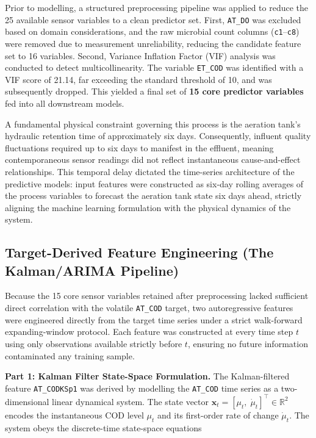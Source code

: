 \documentclass[conference]{IEEEtran}
\begin{document}
Prior to modelling, a structured preprocessing pipeline was applied to reduce the 25 available sensor variables to a clean predictor set. First, \texttt{AT\_DO} was excluded based on domain considerations, and the raw microbial count columns (\texttt{c1}--\texttt{c8}) were removed due to measurement unreliability, reducing the candidate feature set to 16 variables. Second, Variance Inflation Factor (VIF) analysis was conducted to detect multicollinearity. The variable \texttt{ET\_COD} was identified with a VIF score of 21.14, far exceeding the standard threshold of 10, and was subsequently dropped. This yielded a final set of \textbf{15 core predictor variables} fed into all downstream models.

A fundamental physical constraint governing this process is the aeration tank's hydraulic retention time of approximately six days. Consequently, influent quality fluctuations required up to six days to manifest in the effluent, meaning contemporaneous sensor readings did not reflect instantaneous cause-and-effect relationships. This temporal delay dictated the time-series architecture of the predictive models: input features were constructed as six-day rolling averages of the process variables to forecast the aeration tank state six days ahead, strictly aligning the machine learning formulation with the physical dynamics of the system.

\subsection{Target-Derived Feature Engineering (The Kalman/ARIMA Pipeline)}

Because the 15 core sensor variables retained after preprocessing lacked sufficient direct correlation with the volatile \texttt{AT\_COD} target, two autoregressive features were engineered directly from the target time series under a strict walk-forward expanding-window protocol. Each feature was constructed at every time step $t$ using only observations available strictly before $t$, ensuring no future information contaminated any training sample.

\textbf{Part 1: Kalman Filter State-Space Formulation.}
The Kalman-filtered feature \texttt{AT\_CODKSp1} was derived by modelling the \texttt{AT\_COD} time series as a two-dimensional linear dynamical system. The state vector $\mathbf{x}_t = [\mu_t,\;\dot{\mu}_t]^\top \in \mathbb{R}^2$ encodes the instantaneous COD level $\mu_t$ and its first-order rate of change $\dot{\mu}_t$. The system obeys the discrete-time state-space equations
\end{document}

